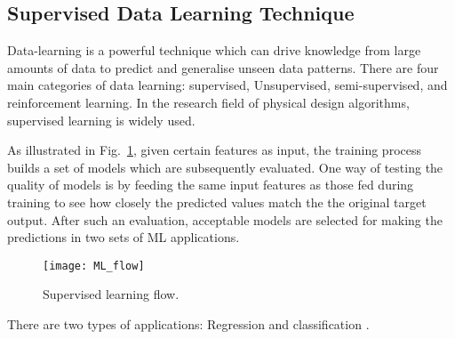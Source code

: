 \subsection{Supervised Data Learning Technique}
Data-learning is a powerful technique which can drive knowledge from large amounts of data to predict and generalise unseen data patterns. There are four main categories of data learning: supervised, Unsupervised, semi-supervised, and reinforcement learning. In the research field of physical design algorithms, supervised learning is widely used.

As illustrated in Fig.~\ref{fig:ml_flow}, given certain features as input, the training process builds a set of models which are subsequently evaluated. One way of testing the quality of models is by feeding the same input features as those fed during training to see how closely the predicted values match the the original target output. After such an evaluation, acceptable models are selected for making the predictions in two sets of ML applications. 
\begin{figure}[tb!]
    \centering
    \texttt{[image: ML\_flow]}
    \caption{Supervised learning flow.}
    \label{fig:ml_flow}
\end{figure}
There are two types of applications: Regression and classification \cite{MLtypes}.
